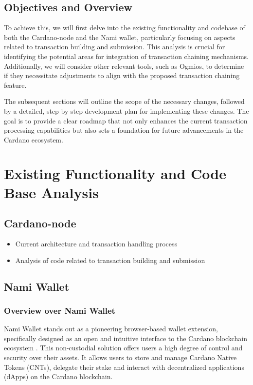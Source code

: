 \documentclass[11pt]{article}
\begin{document}
\subsection{Objectives and Overview}
To achieve this, we will first delve into the existing functionality and codebase of both the Cardano-node and the Nami wallet,
particularly focusing on aspects related to transaction building and submission.
This analysis is crucial for identifying the potential areas for integration of transaction chaining mechanisms.
Additionally, we will consider other relevant tools, such as Ogmios, to determine if they necessitate adjustments to align with the proposed transaction chaining feature.

The subsequent sections will outline the scope of the necessary changes, followed by a detailed, step-by-step development plan for implementing these changes.
The goal is to provide a clear roadmap that not only enhances the current transaction processing capabilities but also sets a foundation for future advancements in the Cardano ecosystem.

\section{Existing Functionality and Code Base Analysis}
\subsection{Cardano-node}
\begin{itemize}
    \item Current architecture and transaction handling process
    \item Analysis of code related to transaction building and submission
\end{itemize}
\subsection{Nami Wallet}

\subsubsection{Overview over Nami Wallet}

Nami Wallet stands out as a pioneering browser-based wallet extension, specifically designed as an open and intuitive interface to the Cardano blockchain ecosystem \cite{nami}.
This non-custodial solution offers users a high degree of control and security over their assets.
It allows users to store and manage Cardano Native Tokens (CNTs), delegate their stake and interact with decentralized applications (dApps) on the Cardano blockchain.
\end{document}
